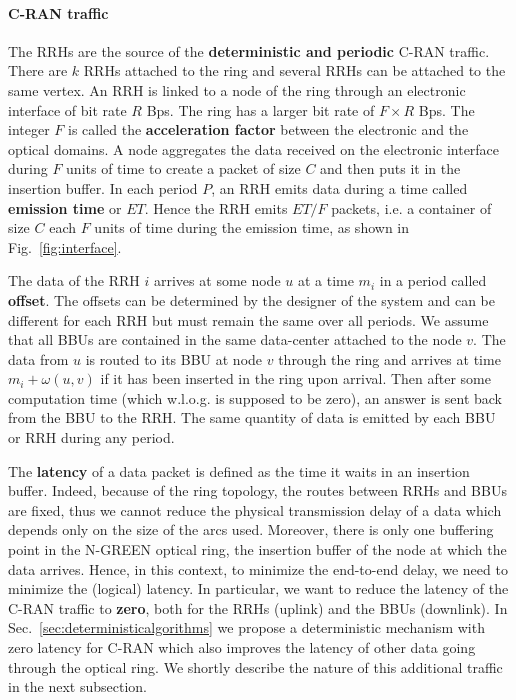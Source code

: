 \documentclass[10pt, conference, letterpaper]{IEEEtran}
\begin{document}
     \paragraph{C-RAN traffic}
   
   The RRHs are the source of the {\bf deterministic and periodic} C-RAN traffic.
   There are $k$ RRHs attached to the ring and several RRHs can be attached to the same vertex. An RRH is linked to a node of the ring through an electronic interface of bit rate $R$ Bps.
   The ring has a larger bit rate of $F\times R$ Bps. The integer $F$ is called the {\bf acceleration factor} between the electronic and the optical domains. A node aggregates the data received on the electronic interface during $F$ units of time to create a packet of size $C$ and then puts it in the insertion buffer.
  In each period $P$, an RRH emits data during a time called \textbf{emission time} or $ET$. Hence the RRH emits $ET / F$ packets, i.e. a container of size $C$ each $F$ units of time during the emission time, as shown in Fig.~\ref{fig:interface}.
   
   The data of the RRH $i$ arrives at some node $u$ at a time $m_i$ in a period called {\bf offset}. The offsets can be determined by the designer of the system and can be different for each RRH but must remain the same over all periods. We assume that all BBUs are contained in the same data-center attached to the node $v$. The data from $u$ is routed to its BBU at node $v$ through the ring and arrives at time $m_i + \omega(u,v)$ if it has been inserted in the ring upon arrival. Then after some computation time (which w.l.o.g. is supposed to be zero), an answer is sent back from the BBU to the RRH. The same quantity of data is emitted by each BBU or RRH during any period.
   
   The {\bf latency} of a data packet is defined as the time it waits in an insertion buffer.
   Indeed, because of the ring topology, the routes between RRHs and BBUs are fixed, thus we cannot reduce the physical transmission delay of a data which depends only on the size of the arcs used. Moreover, there is only one buffering point in the N-GREEN optical ring, the insertion buffer of the node at which the data arrives. Hence, in this context, to minimize the end-to-end delay, we need to minimize the (logical) latency.
   In particular, we want to reduce the latency of the C-RAN traffic to \textbf{zero}, both for the RRHs (uplink) and the BBUs (downlink). In Sec.~\ref{sec:deterministicalgorithms} we propose a deterministic mechanism with zero latency for C-RAN which also improves the latency of other data going through the optical ring. We shortly describe the nature of this additional traffic in the next subsection.
   
\end{document}
